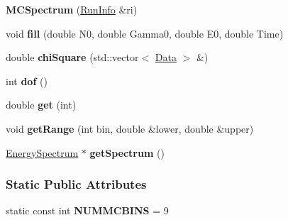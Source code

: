 \begin{DoxyCompactItemize}
\item 
\hypertarget{classMCSpectrum_ae7bb310b53fe6faf2fbdb74017c627db}{
{\bfseries MCSpectrum} (\hyperlink{classRunInfo}{RunInfo} \&ri)}
\label{classMCSpectrum_ae7bb310b53fe6faf2fbdb74017c627db}

\item 
\hypertarget{classMCSpectrum_a7e79cfbd1d264d02e46010375e399aca}{
void {\bfseries fill} (double N0, double Gamma0, double E0, double Time)}
\label{classMCSpectrum_a7e79cfbd1d264d02e46010375e399aca}

\item 
\hypertarget{classMCSpectrum_a0777ca61a540ea776229d523ff32b0f4}{
double {\bfseries chiSquare} (std::vector$<$ \hyperlink{structData}{Data} $>$ \&)}
\label{classMCSpectrum_a0777ca61a540ea776229d523ff32b0f4}

\item 
\hypertarget{classMCSpectrum_ad677cf1fbb8de27981202ad6056ebf58}{
int {\bfseries dof} ()}
\label{classMCSpectrum_ad677cf1fbb8de27981202ad6056ebf58}

\item 
\hypertarget{classMCSpectrum_aadcdac2c8cf36b4c6b76f9c0f7a04d65}{
double {\bfseries get} (int)}
\label{classMCSpectrum_aadcdac2c8cf36b4c6b76f9c0f7a04d65}

\item 
\hypertarget{classMCSpectrum_aea3d956882a19612b53dfabf4a4ee36f}{
void {\bfseries getRange} (int bin, double \&lower, double \&upper)}
\label{classMCSpectrum_aea3d956882a19612b53dfabf4a4ee36f}

\item 
\hypertarget{classMCSpectrum_aff6aa85d0e2a5006caf0b194ec53dae1}{
\hyperlink{classEnergySpectrum}{EnergySpectrum} $\ast$ {\bfseries getSpectrum} ()}
\label{classMCSpectrum_aff6aa85d0e2a5006caf0b194ec53dae1}

\end{DoxyCompactItemize}
\subsubsection*{Static Public Attributes}
\begin{DoxyCompactItemize}
\item 
\hypertarget{classMCSpectrum_a331195d13e485713885e0a195654e44c}{
static const int {\bfseries NUMMCBINS} = 9}
\label{classMCSpectrum_a331195d13e485713885e0a195654e44c}

\end{DoxyCompactItemize}


